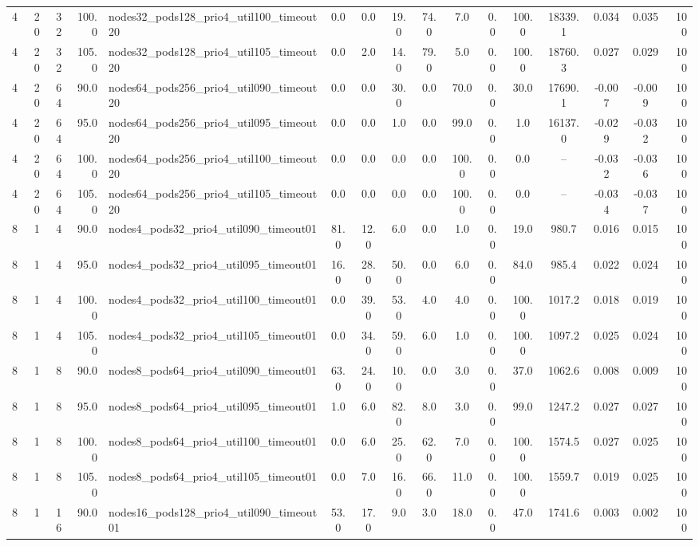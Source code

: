 \begin{tabular}{r r r r l c c c c c c c c c c r}
4 & 20 & 32 & 100.0 & nodes32\_pods128\_prio4\_util100\_timeout20 & 0.0 & 0.0 & 19.0 & 74.0 & 7.0 & 0.0 & 100.0 & 18339.1 & 0.034 & 0.035 & 100 \\
4 & 20 & 32 & 105.0 & nodes32\_pods128\_prio4\_util105\_timeout20 & 0.0 & 2.0 & 14.0 & 79.0 & 5.0 & 0.0 & 100.0 & 18760.3 & 0.027 & 0.029 & 100 \\
4 & 20 & 64 & 90.0 & nodes64\_pods256\_prio4\_util090\_timeout20 & 0.0 & 0.0 & 30.0 & 0.0 & 70.0 & 0.0 & 30.0 & 17690.1 & -0.007 & -0.009 & 100 \\
4 & 20 & 64 & 95.0 & nodes64\_pods256\_prio4\_util095\_timeout20 & 0.0 & 0.0 & 1.0 & 0.0 & 99.0 & 0.0 & 1.0 & 16137.0 & -0.029 & -0.032 & 100 \\
4 & 20 & 64 & 100.0 & nodes64\_pods256\_prio4\_util100\_timeout20 & 0.0 & 0.0 & 0.0 & 0.0 & 100.0 & 0.0 & 0.0 & -- & -0.032 & -0.036 & 100 \\
4 & 20 & 64 & 105.0 & nodes64\_pods256\_prio4\_util105\_timeout20 & 0.0 & 0.0 & 0.0 & 0.0 & 100.0 & 0.0 & 0.0 & -- & -0.034 & -0.037 & 100 \\
8 & 1 & 4 & 90.0 & nodes4\_pods32\_prio4\_util090\_timeout01 & 81.0 & 12.0 & 6.0 & 0.0 & 1.0 & 0.0 & 19.0 & 980.7 & 0.016 & 0.015 & 100 \\
8 & 1 & 4 & 95.0 & nodes4\_pods32\_prio4\_util095\_timeout01 & 16.0 & 28.0 & 50.0 & 0.0 & 6.0 & 0.0 & 84.0 & 985.4 & 0.022 & 0.024 & 100 \\
8 & 1 & 4 & 100.0 & nodes4\_pods32\_prio4\_util100\_timeout01 & 0.0 & 39.0 & 53.0 & 4.0 & 4.0 & 0.0 & 100.0 & 1017.2 & 0.018 & 0.019 & 100 \\
8 & 1 & 4 & 105.0 & nodes4\_pods32\_prio4\_util105\_timeout01 & 0.0 & 34.0 & 59.0 & 6.0 & 1.0 & 0.0 & 100.0 & 1097.2 & 0.025 & 0.024 & 100 \\
8 & 1 & 8 & 90.0 & nodes8\_pods64\_prio4\_util090\_timeout01 & 63.0 & 24.0 & 10.0 & 0.0 & 3.0 & 0.0 & 37.0 & 1062.6 & 0.008 & 0.009 & 100 \\
8 & 1 & 8 & 95.0 & nodes8\_pods64\_prio4\_util095\_timeout01 & 1.0 & 6.0 & 82.0 & 8.0 & 3.0 & 0.0 & 99.0 & 1247.2 & 0.027 & 0.027 & 100 \\
8 & 1 & 8 & 100.0 & nodes8\_pods64\_prio4\_util100\_timeout01 & 0.0 & 6.0 & 25.0 & 62.0 & 7.0 & 0.0 & 100.0 & 1574.5 & 0.027 & 0.025 & 100 \\
8 & 1 & 8 & 105.0 & nodes8\_pods64\_prio4\_util105\_timeout01 & 0.0 & 7.0 & 16.0 & 66.0 & 11.0 & 0.0 & 100.0 & 1559.7 & 0.019 & 0.025 & 100 \\
8 & 1 & 16 & 90.0 & nodes16\_pods128\_prio4\_util090\_timeout01 & 53.0 & 17.0 & 9.0 & 3.0 & 18.0 & 0.0 & 47.0 & 1741.6 & 0.003 & 0.002 & 100 \\

\end{tabular}
